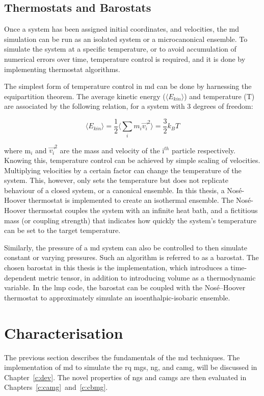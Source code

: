 \subsection{Thermostats and Barostats}
Once a system has been assigned initial coordinates, and velocities, the \gls{md} simulation can be run as an isolated system or a microcanonical ensemble. To simulate the system at a specific temperature, or to avoid accumulation of numerical errors over time, temperature control is required, and it is done by implementing thermostat algorithms. \par

The simplest form of temperature control in \gls{md} can be done by harnessing the equipartition theorem. The average kinetic energy ($\langle E_{kin} \rangle $) and temperature (T) are associated by the following relation, for a system with 3 degrees of freedom:

\begin{equation}
\langle E_{kin} \rangle = \frac{1}{2} \langle \sum_{i} m_i \vec{v_i}^2 \rangle = \frac{3}{2} k_B T
\end{equation}

where m$_i$ and $\vec{v_i}^2$ are the mass and velocity of the i$^{th}$ particle respectively. Knowing this, temperature control can be achieved by simple scaling of velocities. Multiplying velocities by a certain factor can change the temperature of the system. This, however, only sets the temperature but does not replicate behaviour of a closed system, or a canonical ensemble. In this thesis, a Nos\'e-Hoover thermostat \cite{Hoover1985} is implemented to create an isothermal ensemble. The Nos\'e-Hoover thermostat couples the system with an infinite heat bath, and a fictitious mass (or coupling strength) that indicates how quickly the system's temperature can be set to the target temperature. \par
 
Similarly, the pressure of a \gls{md} system can also be controlled to then simulate constant or varying pressures. Such an algorithm is referred to as a barostat. The chosen barostat in this thesis is the \textcite{Parrinello1980} implementation, which introduces a time-dependent metric tensor, in addition to introducing volume as a thermodynamic variable. In the \gls{lmp} code, the barostat can be coupled with the Nos\'e–Hoover thermostat to approximately simulate an isoenthalpic-isobaric ensemble. \par

\section{Characterisation}
The previous section describes the fundamentals of the \gls{md} techniques. The implementation of \gls{md} to simulate the \gls{rq} \gls{mg}s, \gls{ng}, and \gls{camg}, will be discussed in Chapter~\ref{c:dev}. The novel properties of \gls{ng}s and \gls{camg}s are then evaluated in Chapters~\ref{c:camg}~and~\ref{c:cbmg}. \par


